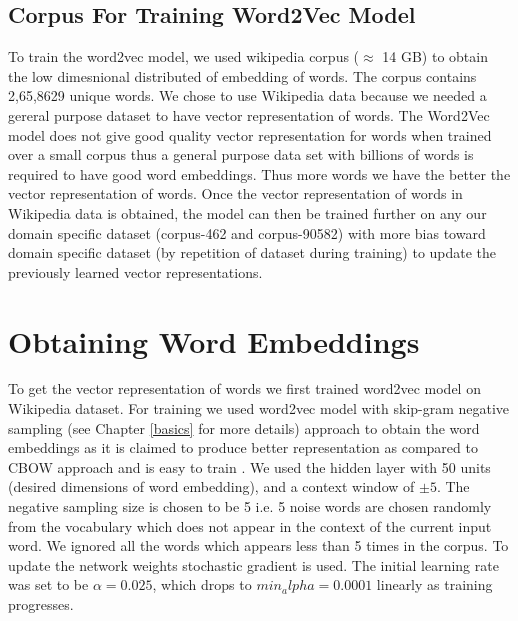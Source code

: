 \subsection{Corpus For Training Word2Vec Model}

To train the word2vec model, we used wikipedia corpus ($\approx$ 14 GB) to obtain the  low dimesnional distributed of embedding of words. The corpus contains 2,65,8629 unique words. We chose to use Wikipedia data because we needed a gereral purpose dataset to have vector representation of words. The Word2Vec model does not give good quality vector representation for words when trained over a small corpus thus a general purpose data set with billions of words is required to have good word embeddings. Thus more words we have the better the vector representation of words. Once the vector representation of words in Wikipedia data is obtained, the model can then be trained further on any our domain specific dataset (corpus-462 and corpus-90582) with more bias toward domain specific dataset (by repetition of dataset during training) to update the previously learned vector representations. 

\section{Obtaining Word Embeddings} \label{get_word_embeddings}

To get the vector representation of words we first trained word2vec model on Wikipedia dataset. For training we used word2vec model with skip-gram negative sampling (see Chapter \ref{basics} for more details) approach to obtain the word embeddings as it is claimed to produce better representation as compared to CBOW approach and is easy to train \cite{w2v:mikolov_2013_efficien, w2v:mikolov_2013_distributed}. We used the hidden layer with 50 units (desired dimensions of word embedding), and a context window of $\pm 5$. The negative sampling size is chosen to be 5 i.e. 5 noise words are chosen randomly from the vocabulary which does not appear in the context of the current input word. We ignored all the words which appears less than 5 times in the corpus. To update the network weights stochastic gradient is used. The initial learning rate was set to be $\alpha=0.025$, which drops to $min_alpha = 0.0001$ linearly as training progresses. 

